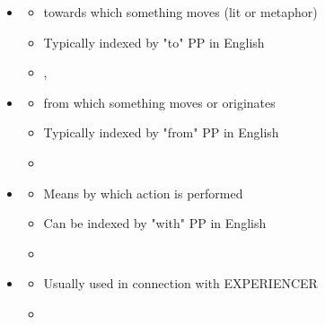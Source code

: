 \documentclass[headrule,footrule]{foils}
\begin{document}
\begin{itemize}
\item  {}
  \begin{itemize}
  \item  towards which something moves (lit or metaphor)
 \item  Typically indexed by "to" PP in English 
 \item  {}, 
  \end{itemize}
\item  {}
 \begin{itemize}
 \item  from which something moves or originates
 \item  Typically indexed by "from" PP in English
 \item  {}  
 \end{itemize}
\newpage
\item  {}
  \begin{itemize}
  \item  Means by which action is performed
  \item  Can be indexed by "with" PP in English
  \item  {}
  \end{itemize}
\item  {}
  \begin{itemize}
  \item  Usually used in connection with EXPERIENCER
  \item  {}
\end{itemize}
\end{itemize}
\end{document}
